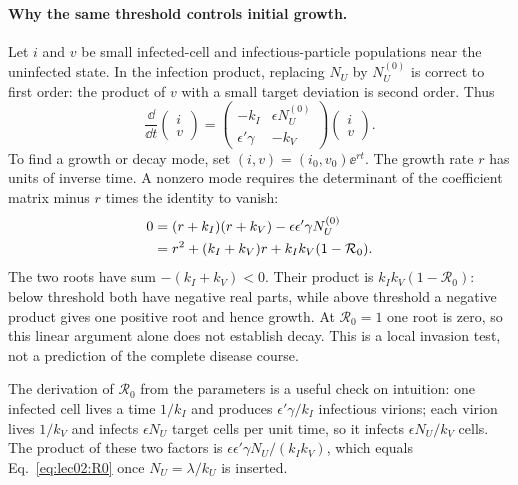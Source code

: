 \paragraph{Why the same threshold controls initial growth.}
Let $i$ and $v$ be small infected-cell and infectious-particle populations near the uninfected state. In the infection product, replacing $N_U$ by $N_U^{(0)}$ is correct to first order: the product of $v$ with a small target deviation is second order. Thus
\begin{equation}\label{eq:lec02:infection-linearisation}
\frac{\dd}{\dd t}\begin{pmatrix}i\\v\end{pmatrix}
=\begin{pmatrix}-k_I&\epsilon N_U^{(0)}\\\epsilon'\gamma&-k_V\end{pmatrix}
\begin{pmatrix}i\\v\end{pmatrix}.
\end{equation}
To find a growth or decay mode, set $(i,v)=(i_0,v_0)\ee^{rt}$. The growth rate $r$ has units of inverse time. A nonzero mode requires the determinant of the coefficient matrix minus $r$ times the identity to vanish:
\begin{align}
0&=(r+k_I)(r+k_V)-\epsilon\epsilon'\gamma N_U^{(0)}\notag\\
&=r^2+(k_I+k_V)r+k_Ik_V(1-\mathcal R_0).\label{eq:lec02:growth-characteristic}
\end{align}
The two roots have sum $-(k_I+k_V)<0$. Their product is $k_Ik_V(1-\mathcal R_0)$: below threshold both have negative real parts, while above threshold a negative product gives one positive root and hence growth. At $\mathcal R_0=1$ one root is zero, so this linear argument alone does not establish decay. This is a local invasion test, not a prediction of the complete disease course.

The derivation of $\mathcal R_0$ from the parameters is a useful check on intuition: one infected cell lives a time $1/k_I$ and produces $\epsilon'\gamma/k_I$ infectious virions; each virion lives $1/k_V$ and infects $\epsilon N_U$ target cells per unit time, so it infects $\epsilon N_U/k_V$ cells. The product of these two factors is $\epsilon\epsilon'\gamma N_U/(k_Ik_V)$, which equals Eq.~\eqref{eq:lec02:R0} once $N_U=\lambda/k_U$ is inserted.


